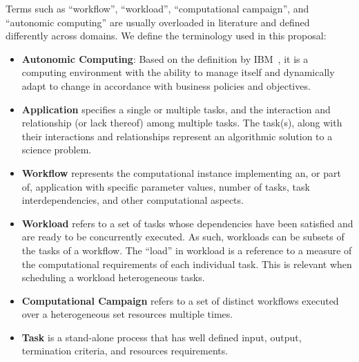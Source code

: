 Terms such as ``workflow'', ``workload'', ``computational campaign'', and 
``autonomic computing'' are usually overloaded in literature and defined 
differently across domains. We define the terminology used in this proposal:
\begin{itemize}
    \item \textbf{Autonomic Computing}: Based on the definition by 
    IBM~\cite{ibm2005autonomic}, it is a computing environment with the ability 
    to manage itself and dynamically adapt to change in accordance with 
    business policies and objectives.
    \item \textbf{Application} specifies a single or multiple tasks, and the 
    interaction and relationship (or lack thereof) among multiple tasks. The 
    task(s), along with their interactions and relationships represent an 
    algorithmic solution to a science problem.
    \item \textbf{Workflow} represents the computational instance implementing 
    an, or part of, application with specific parameter values, number of tasks, 
    task interdependencies, and other computational aspects.
    \item \textbf{Workload} refers to a set of tasks whose dependencies have 
    been satisfied and are ready to be concurrently executed. As such, 
    workloads can be subsets of the tasks of a workflow. The “load” in workload 
    is a reference to a measure of the computational requirements of each 
    individual task. This is relevant when scheduling a workload heterogeneous 
    tasks.
    \item \textbf{Computational Campaign} refers to a set of distinct workflows executed over a heterogeneous set resources multiple times.
    \item \textbf{Task} is a stand-alone process that has well defined input, output, termination criteria, and resources requirements.
\end{itemize}